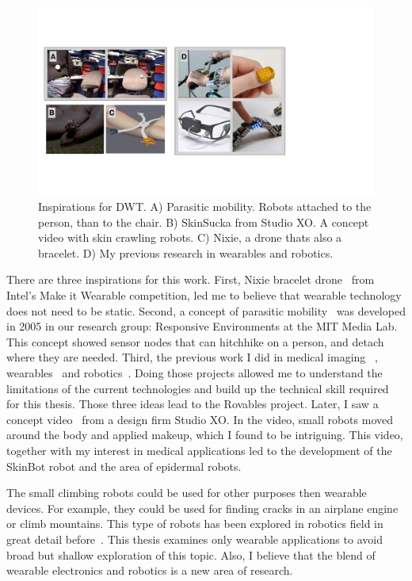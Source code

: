 \begin{figure}[!ht]
\centering
\includegraphics[width=\textwidth]{pictures/chapter1/inspirations.pdf}
\caption{Inspirations for DWT. A) Parasitic mobility. Robots attached to the person, than to the chair. B) SkinSucka from Studio XO. A concept video with skin crawling robots. C) Nixie, a drone thats also a bracelet. D) My previous research in wearables and robotics. }
\label{fig:inspirations}
\end{figure}

There are three inspirations for this work. First, Nixie bracelet drone~\cite{nixieDrone} from Intel's Make it Wearable competition, led me to believe that wearable technology does not need to be static.  Second, a concept of parasitic mobility~\cite{laibowitz2005parasitic} was developed in 2005 in our research group: Responsive Environments at the MIT Media Lab. This concept showed sensor nodes that can hitchhike on a person, and detach where they are needed. Third, the previous work I did in medical imaging~\cite{dementyev2017dualblink,dementyev2013temperature} , wearables~\cite{dementyev2014wristflex,kao2015nailo} and robotics~\cite{nakagaki2016chainform,dementyev2016rovables}. Doing those projects allowed me to understand the limitations of the current technologies and build up the technical skill required for this thesis. Those three ideas lead to the Rovables project. Later, I saw a concept video~\cite{SkinSucka} from a design firm Studio XO. In the video, small robots moved around the body and applied makeup, which I found to be intriguing. This video, together with my interest in medical applications led to the development of the SkinBot robot and the area of epidermal robots.

The small climbing robots could be used for other purposes then wearable devices. For example, they could be used for finding cracks in an airplane engine or climb mountains. This type of robots has been explored in robotics field in great detail before~\cite{lam2011flexible,eich2011design}. This thesis examines only wearable applications to avoid broad but shallow exploration of this topic.  Also, I believe that the blend of wearable electronics and robotics is a new area of research. 

